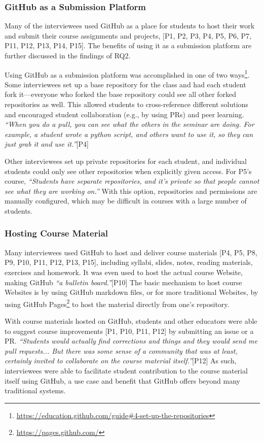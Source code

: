 \subsubsection{GitHub as a Submission Platform}
Many of the interviewees used GitHub as a place for students to host their work and submit their course assignments and projects, [P1, P2, P3, P4, P5, P6, P7, P11, P12, P13, P14, P15]. The benefits of using it as a submission platform are further discussed in the findings of RQ2.

Using GitHub as a submission platform was accomplished in one of two ways\footnote{\url{https://education.github.com/guide\#4-set-up-the-repositories}}. Some interviewees set up a base repository for the class and had each student fork it---everyone who forked the base repository could see all other forked repositories as well. This allowed students to cross-reference different solutions and encouraged student collaboration (e.g., by using PRs) and peer learning. \textit{``When you do a pull, you can see what the others in the seminar are doing. For example, a student wrote a python script, and others want to use it, so they can just grab it and use it.''}[P4]

Other interviewees set up private repositories for each student, and individual students could only see other repositories when explicitly given access. For P5's course, \textit{``Students have separate repositories, and it's private so that people cannot see what they are working on.''} With this option, repositories and permissions are manually configured, which may be difficult in courses with a large number of students.

\subsubsection{Hosting Course Material}
Many interviewees used GitHub to host and deliver course materials [P4, P5, P8, P9, P10, P11, P12, P13, P15], including syllabi, slides, notes, reading materials, exercises and homework. It was even used to host the actual course Website, making GitHub \textit{``a bulletin board.''}[P10] The basic mechanism to host course Websites is by using GitHub markdown files, or for more traditional Websites, by using GitHub Pages\footnote{\url{https://pages.github.com/}} to host the material directly from one's repository.

With course materials hosted on GitHub, students and other educators were able to suggest course improvements [P1, P10, P11, P12] by submitting an issue or a PR. \textit{``Students would actually find corrections and things and they would send me pull requests... But there was some sense of a community that was at least, certainly invited to collaborate on the course material itself.''}[P12] As such, interviewees were able to facilitate student contribution to the course material itself using GitHub, a use case and benefit that GitHub offers beyond many traditional systems.

